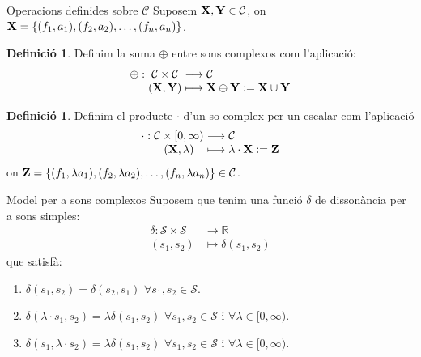 \documentclass[10pt,hyperref={colorlinks,linkcolor=black,citecolor=blue!80,urlcolor=blue!60},handout]{beamer} %
\theoremstyle{definition}
\newtheorem{defin}[theorem]{Definició}
\newcommand{\0}{\ensuremath{\vb{0}}}
\newcommand{\X}{\ensuremath{\vb{X}}}
\newcommand{\Y}{\ensuremath{\vb{Y}}}
\newcommand{\Z}{\ensuremath{\vb{Z}}}
\newcommand{\RR}{\ensuremath{\mathbb{R}}} %
\begin{document}
\begin{frame}{Operacions definides sobre $\mathcal{C}$}
  Suposem $\X,\Y\in\mathcal{C}$, on $\X=\{(f_1,a_1),(f_2,a_2),\ldots,(f_n,a_n)\}$.\par\pause
  \begin{defin}
    Definim la suma $\oplus$ entre sons complexos com l'aplicació:
    $$\begin{array}{r@{\hspace{0.5\tabcolsep}}c@{\hspace{0.5\tabcolsep}}c@{\hspace{0.5\tabcolsep}}l}
        \oplus: & \mathcal{C}\times\mathcal{C} & \longrightarrow & \mathcal{C}           \\
                & (\X,\Y)                      & \longmapsto     & \X\oplus \Y:=\X\cup\Y
      \end{array}$$
  \end{defin}\pause
  \begin{defin}
    Definim el producte $\cdot$ d'un so complex per un escalar com l'aplicació
    $$\begin{array}{r@{\hspace{0.5\tabcolsep}}c@{\hspace{0.5\tabcolsep}}c@{\hspace{0.5\tabcolsep}}l}
        \cdot: & \mathcal{C}\times[0,\infty) & \longrightarrow & \mathcal{C}         \\
               & (\X,\lambda)                & \longmapsto     & \lambda\cdot \X:=\Z
      \end{array}$$
    on $\Z=\{(f_1,\lambda a_1),(f_2,\lambda a_2),\ldots,(f_n,\lambda a_n)\}\in\mathcal{C}$.
  \end{defin}
\end{frame}
\begin{frame}{Model per a sons complexos}
  Suposem que tenim una funció $\delta$ de dissonància per a sons simples:
  \begin{align*}
    \delta:\mathcal{S}\times\mathcal{S} & \longrightarrow\RR         \\
    (s_1,s_2)                           & \longmapsto\delta(s_1,s_2)
  \end{align*}
  que satisfà:
  \begin{enumerate}
    \item $\delta(s_1,s_2)=\delta(s_2,s_1)$ $\forall s_1,s_2\in\mathcal{S}$.\pause
    \item $\delta(\lambda\cdot s_1,s_2)=\lambda\delta(s_1,s_2)$ $\forall s_1,s_2\in\mathcal{S}$ i $\forall\lambda\in[0,\infty)$.\pause
    \item $\delta(s_1,\lambda\cdot s_2)=\lambda\delta(s_1,s_2)$ $\forall s_1,s_2\in\mathcal{S}$ i $\forall \lambda\in[0,\infty)$.
  \end{enumerate}
\end{frame}
\end{document}
